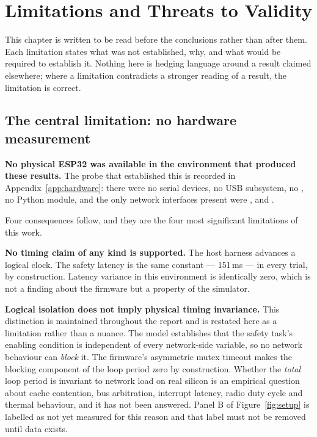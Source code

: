 \chapter{Limitations and Threats to Validity}\label{ch:limitations}

This chapter is written to be read before the conclusions rather than after them. Each limitation
states what was not established, why, and what would be required to establish it. Nothing here is
hedging language around a result claimed elsewhere; where a limitation contradicts a stronger
reading of a result, the limitation is correct.

\section{The central limitation: no hardware measurement}

\textbf{No physical ESP32 was available in the environment that produced these results.} The
probe that established this is recorded in Appendix~\ref{app:hardware}: there were no serial
devices, no USB subsystem, no , no Python  module, and the only
network interfaces present were ,  and .

Four consequences follow, and they are the four most significant limitations of this work.

\textbf{No timing claim of any kind is supported.} The host harness advances a logical clock. The
safety latency is the same constant --- 151\,ms --- in every trial, by construction. Latency
variance in this environment is identically zero, which is not a finding about the firmware but a
property of the simulator.

\textbf{Logical isolation does not imply physical timing invariance.} This distinction is
maintained throughout the report and is restated here as a limitation rather than a nuance. The
model establishes that the safety task's enabling condition is independent of every network-side
variable, so no network behaviour can \emph{block} it. The firmware's asymmetric mutex timeout
makes the blocking component of the loop period zero by construction. Whether the \emph{total}
loop period is invariant to network load on real silicon is an empirical question about cache
contention, bus arbitration, interrupt latency, radio duty cycle and thermal behaviour, and it has
not been answered. Panel B of Figure~\ref{fig:setup} is labelled as not yet measured for this
reason and that label must not be removed until data exists.


